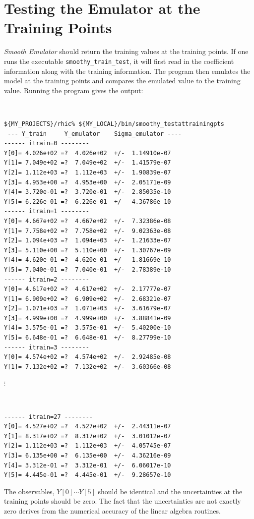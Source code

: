 \documentclass[UserManual.tex]{subfiles}
\begin{document}
\section{Testing the Emulator at the Training Points}
{\it Smooth Emulator} should return the training values at the training points. If one runs the executable {\tt smoothy\_train\_test}, it will first read in the coefficient information along with the training information. The program then emulates the model at the training points and compares the emulated value to the training value. Running the program gives the output:
{\tt
\begin{verbatim}
${MY_PROJECTS}/rhic% ${MY_LOCAL}/bin/smoothy_testattrainingpts
 --- Y_train     Y_emulator    Sigma_emulator ----
------ itrain=0 --------
Y[0]= 4.026e+02 =?  4.026e+02  +/-  1.14910e-07
Y[1]= 7.049e+02 =?  7.049e+02  +/-  1.41579e-07
Y[2]= 1.112e+03 =?  1.112e+03  +/-  1.90839e-07
Y[3]= 4.953e+00 =?  4.953e+00  +/-  2.05171e-09
Y[4]= 3.720e-01 =?  3.720e-01  +/-  2.85035e-10
Y[5]= 6.226e-01 =?  6.226e-01  +/-  4.36786e-10
------ itrain=1 --------
Y[0]= 4.667e+02 =?  4.667e+02  +/-  7.32386e-08
Y[1]= 7.758e+02 =?  7.758e+02  +/-  9.02363e-08
Y[2]= 1.094e+03 =?  1.094e+03  +/-  1.21633e-07
Y[3]= 5.110e+00 =?  5.110e+00  +/-  1.30767e-09
Y[4]= 4.620e-01 =?  4.620e-01  +/-  1.81669e-10
Y[5]= 7.040e-01 =?  7.040e-01  +/-  2.78389e-10
------ itrain=2 --------
Y[0]= 4.617e+02 =?  4.617e+02  +/-  2.17777e-07
Y[1]= 6.909e+02 =?  6.909e+02  +/-  2.68321e-07
Y[2]= 1.071e+03 =?  1.071e+03  +/-  3.61679e-07
Y[3]= 4.999e+00 =?  4.999e+00  +/-  3.88841e-09
Y[4]= 3.575e-01 =?  3.575e-01  +/-  5.40200e-10
Y[5]= 6.648e-01 =?  6.648e-01  +/-  8.27799e-10
------ itrain=3 --------
Y[0]= 4.574e+02 =?  4.574e+02  +/-  2.92485e-08
Y[1]= 7.132e+02 =?  7.132e+02  +/-  3.60366e-08
\end{verbatim}}
$\vdots$\\
{\tt
\begin{verbatim}
------ itrain=27 --------
Y[0]= 4.527e+02 =?  4.527e+02  +/-  2.44311e-07
Y[1]= 8.317e+02 =?  8.317e+02  +/-  3.01012e-07
Y[2]= 1.112e+03 =?  1.112e+03  +/-  4.05745e-07
Y[3]= 6.135e+00 =?  6.135e+00  +/-  4.36216e-09
Y[4]= 3.312e-01 =?  3.312e-01  +/-  6.06017e-10
Y[5]= 4.445e-01 =?  4.445e-01  +/-  9.28657e-10
\end{verbatim}}

The observables, $Y[0]\cdots Y[5]$ should be identical and the uncertainties at the training points should be zero. The fact that the uncertainties are not exactly zero derives from the numerical accuracy of the linear algebra routines.
\end{document}
